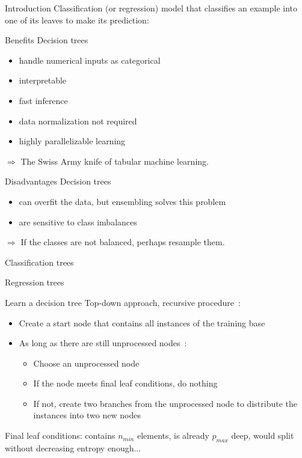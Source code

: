\begin{frame}{Introduction}
  Classification (or regression) model that classifies an example into one of its leaves to make its prediction:
\end{frame}

\begin{frame}{Benefits}
  Decision trees

  \begin{itemize}
    \item handle numerical inputs as categorical
    \item interpretable
    \item fast inference
    \item data normalization not required
    \item highly parallelizable learning
  \end{itemize}

  $\Rightarrow$ The Swiss Army knife of tabular machine learning.
\end{frame}

\begin{frame}{Disadvantages}
  Decision trees

  \begin{itemize}
    \item can overfit the data, but ensembling solves this problem
    \item are sensitive to class imbalances
  \end{itemize}
  $\Rightarrow$ If the classes are not balanced, perhaps resample them.
\end{frame}

\begin{frame}{Classification trees}
\end{frame}

\begin{frame}{Regression trees}
\end{frame}

\begin{frame}{Learn a decision tree}
  Top-down approach, recursive procedure~:

  \begin{itemize}
    \item Create a start node that contains all instances of the training base
    \item As long as there are still unprocessed nodes~:
      \begin{itemize}
        \item Choose an unprocessed node
        \item If the node meets final leaf conditions, do nothing
        \item If not, create two branches from the unprocessed node to distribute the instances into two new nodes
      \end{itemize}
  \end{itemize}

  Final leaf conditions: contains $n_{min}$ elements, is already $p_{max}$ deep, would split without decreasing entropy enough...
\end{frame}

